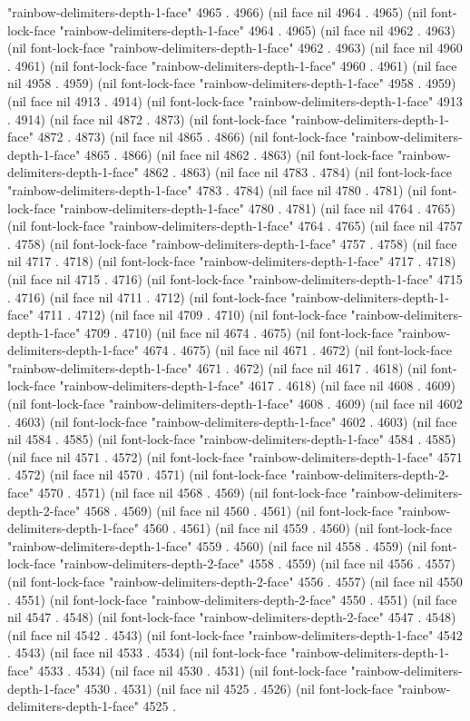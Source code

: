 "rainbow-delimiters-depth-1-face" 4965 . 4966) (nil face nil 4964 . 4965) (nil font-lock-face "rainbow-delimiters-depth-1-face" 4964 . 4965) (nil face nil 4962 . 4963) (nil font-lock-face "rainbow-delimiters-depth-1-face" 4962 . 4963) (nil face nil 4960 . 4961) (nil font-lock-face "rainbow-delimiters-depth-1-face" 4960 . 4961) (nil face nil 4958 . 4959) (nil font-lock-face "rainbow-delimiters-depth-1-face" 4958 . 4959) (nil face nil 4913 . 4914) (nil font-lock-face "rainbow-delimiters-depth-1-face" 4913 . 4914) (nil face nil 4872 . 4873) (nil font-lock-face "rainbow-delimiters-depth-1-face" 4872 . 4873) (nil face nil 4865 . 4866) (nil font-lock-face "rainbow-delimiters-depth-1-face" 4865 . 4866) (nil face nil 4862 . 4863) (nil font-lock-face "rainbow-delimiters-depth-1-face" 4862 . 4863) (nil face nil 4783 . 4784) (nil font-lock-face "rainbow-delimiters-depth-1-face" 4783 . 4784) (nil face nil 4780 . 4781) (nil font-lock-face "rainbow-delimiters-depth-1-face" 4780 . 4781) (nil face nil 4764 . 4765) (nil font-lock-face "rainbow-delimiters-depth-1-face" 4764 . 4765) (nil face nil 4757 . 4758) (nil font-lock-face "rainbow-delimiters-depth-1-face" 4757 . 4758) (nil face nil 4717 . 4718) (nil font-lock-face "rainbow-delimiters-depth-1-face" 4717 . 4718) (nil face nil 4715 . 4716) (nil font-lock-face "rainbow-delimiters-depth-1-face" 4715 . 4716) (nil face nil 4711 . 4712) (nil font-lock-face "rainbow-delimiters-depth-1-face" 4711 . 4712) (nil face nil 4709 . 4710) (nil font-lock-face "rainbow-delimiters-depth-1-face" 4709 . 4710) (nil face nil 4674 . 4675) (nil font-lock-face "rainbow-delimiters-depth-1-face" 4674 . 4675) (nil face nil 4671 . 4672) (nil font-lock-face "rainbow-delimiters-depth-1-face" 4671 . 4672) (nil face nil 4617 . 4618) (nil font-lock-face "rainbow-delimiters-depth-1-face" 4617 . 4618) (nil face nil 4608 . 4609) (nil font-lock-face "rainbow-delimiters-depth-1-face" 4608 . 4609) (nil face nil 4602 . 4603) (nil font-lock-face "rainbow-delimiters-depth-1-face" 4602 . 4603) (nil face nil 4584 . 4585) (nil font-lock-face "rainbow-delimiters-depth-1-face" 4584 . 4585) (nil face nil 4571 . 4572) (nil font-lock-face "rainbow-delimiters-depth-1-face" 4571 . 4572) (nil face nil 4570 . 4571) (nil font-lock-face "rainbow-delimiters-depth-2-face" 4570 . 4571) (nil face nil 4568 . 4569) (nil font-lock-face "rainbow-delimiters-depth-2-face" 4568 . 4569) (nil face nil 4560 . 4561) (nil font-lock-face "rainbow-delimiters-depth-1-face" 4560 . 4561) (nil face nil 4559 . 4560) (nil font-lock-face "rainbow-delimiters-depth-1-face" 4559 . 4560) (nil face nil 4558 . 4559) (nil font-lock-face "rainbow-delimiters-depth-2-face" 4558 . 4559) (nil face nil 4556 . 4557) (nil font-lock-face "rainbow-delimiters-depth-2-face" 4556 . 4557) (nil face nil 4550 . 4551) (nil font-lock-face "rainbow-delimiters-depth-2-face" 4550 . 4551) (nil face nil 4547 . 4548) (nil font-lock-face "rainbow-delimiters-depth-2-face" 4547 . 4548) (nil face nil 4542 . 4543) (nil font-lock-face "rainbow-delimiters-depth-1-face" 4542 . 4543) (nil face nil 4533 . 4534) (nil font-lock-face "rainbow-delimiters-depth-1-face" 4533 . 4534) (nil face nil 4530 . 4531) (nil font-lock-face "rainbow-delimiters-depth-1-face" 4530 . 4531) (nil face nil 4525 . 4526) (nil font-lock-face "rainbow-delimiters-depth-1-face" 4525 . 